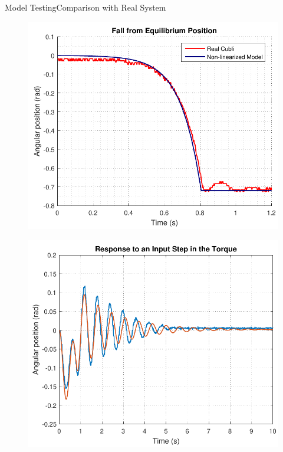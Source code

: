 \begin{frame}{Model Testing}{Comparison with Real System}
  \begin{minipage}{\linewidth}\centering
    \begin{minipage}{0.45\linewidth}
      \begin{figure}[H]
        \centering
        \includegraphics[scale=0.33]{Pictures/FallTestComparison}
      \end{figure}
    \end{minipage}
    \hspace{0.03\linewidth}
    \begin{minipage}{0.45\linewidth}
      \begin{figure}[H]
        \centering
        \includegraphics[scale=0.33]{Pictures/StepTest}
      \end{figure}
    \end{minipage}
  \end{minipage}
\end{frame}